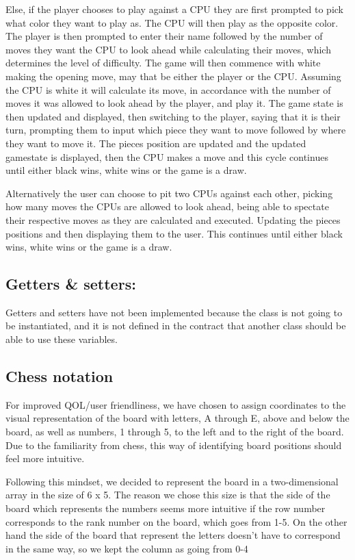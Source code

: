 \documentclass[12pt, a4paper]{article}
\begin{document}
	Else, if the player chooses to play against a CPU they are first prompted to pick what color they want to play as. The CPU will then play as the opposite color. The player is then prompted to enter their name followed by the number of moves they want the CPU to look ahead while calculating their moves, which determines the level of difficulty. The game will then commence with white making the opening move, may that be either the player or the CPU. Assuming the CPU is white it will calculate its move, in accordance with the number of moves it was allowed to look ahead by the player, and play it. The game state is then updated and displayed, then switching to the player, saying that it is their turn, prompting them to input which piece they want to move followed by where they want to move it. The pieces position are updated and the updated gamestate is displayed, then the CPU makes a move and this cycle continues until either black wins, white wins or the game is a draw. 
	
	Alternatively the user can choose to pit two CPUs against each other, picking how many moves the CPUs are allowed to look ahead, being able to spectate their respective moves as they are calculated and executed. Updating the pieces positions and then displaying them to the user. This continues until either black wins, white wins or the game is a draw.
	
	\subsection{Getters \& setters:}
	
	Getters and setters have not been implemented because the class is not going to be instantiated, and it is not defined in the contract that another class should be able to use these variables.	
	
	\subsection{Chess notation}
	
	For improved QOL/user friendliness, we have chosen to assign coordinates to the visual representation of the board with letters, A through E, above and below the board, as well as numbers, 1 through 5, to the left and to the right of the board. Due to the familiarity from chess, this way of identifying board positions should feel more intuitive.
	
	Following this mindset, we decided to represent the board in a two-dimensional array in the size of 6 x 5. The reason we chose this size is that the side of the board which represents the numbers seems more intuitive if the row number corresponds to the rank number on the board, which goes from 1-5. On the other hand the side of the board that represent the letters doesn’t have to correspond in the same way, so we kept the column as going from 0-4
\end{document}

